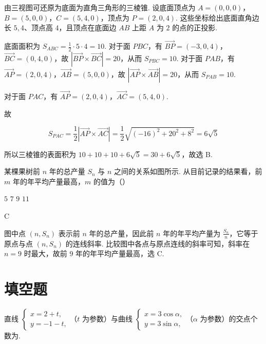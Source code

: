 \begin{solution}
由三视图可还原为底面为直角三角形的三棱锥. 设底面顶点为 \(A=(0,0,0)\)，\(B=(5,0,0)\)，\(C=(5,4,0)\)，顶点为 \(P=(2,0,4)\). 这些坐标给出底面直角边长 \(5,4\)、顶点高 \(4\)，且顶点在底面边 \(AB\) 上距 \(A\) 为 \(2\) 的点的正投影.

底面面积为 \(S_{ABC}=\frac12\cdot5\cdot4=10\). 对于面 \(PBC\)，有 \(\overrightarrow{BP}=(-3,0,4)\)，\(\overrightarrow{BC}=(0,4,0)\)，故 \(\left\lvert\overrightarrow{BP}\times\overrightarrow{BC}\right\rvert=20\)，从而 \(S_{PBC}=10\). 对于面 \(PAB\)，有 \(\overrightarrow{AP}=(2,0,4)\)，\(\overrightarrow{AB}=(5,0,0)\)，故 \(\left\lvert\overrightarrow{AP}\times\overrightarrow{AB}\right\rvert=20\)，从而 \(S_{PAB}=10\).

对于面 \(PAC\)，有 \(\overrightarrow{AP}=(2,0,4)\)，\(\overrightarrow{AC}=(5,4,0)\).

故

\[
S_{PAC}=\frac12\left\lvert\overrightarrow{AP}\times\overrightarrow{AC}\right\rvert=\frac12\sqrt{(-16)^2+20^2+8^2}=6\sqrt5
\]

所以三棱锥的表面积为 \(10+10+10+6\sqrt5=30+6\sqrt5\)，故选 B.
\end{solution}

\begin{problem}
某棵果树前 \(n\) 年的总产量 \(S_n\) 与 \(n\) 之间的关系如图所示. 从目前记录的结果看，前 \(m\) 年的年平均产量最高，\(m\) 的值为（\quad）


\choices
    {\(5\)}
    {\(7\)}
    {\(9\)}
    {\(11\)}
\end{problem}

\begin{answer}
C
\end{answer}

\begin{solution}
图中点 \((n,S_n)\) 表示前 \(n\) 年的总产量，因此前 \(n\) 年的年平均产量为 \(\frac{S_n}{n}\)，它等于原点与点 \((n,S_n)\) 的连线斜率. 比较图中各点与原点连线的斜率可知，斜率在 \(n=9\) 时最大，故前 \(9\) 年的年平均产量最高，选 C.
\end{solution}

\section{填空题}

\begin{problem}
直线 \(\begin{cases}
x=2+t,\\
y=-1-t,
\end{cases}\)（\(t\) 为参数）与曲线 \(\begin{cases}
x=3\cos\alpha,\\
y=3\sin\alpha,
\end{cases}\)（\(\alpha\) 为参数）的交点个数为\fillinblank{}.
\end{problem}

